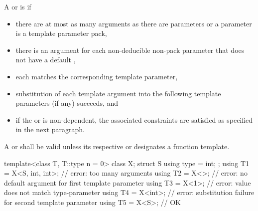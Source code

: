 \pnum
A  or 
is  if
\begin{itemize}
\item
  there are at most as many arguments as there are parameters
  or a parameter is a template parameter pack,

\item
  there is an argument for each non-deducible non-pack parameter
  that does not have a default ,

\item
  each  matches the corresponding
  template parameter,

\item
  substitution of each template argument into the following
  template parameters (if any) succeeds, and

\item
  if the  or
   is non-dependent,
  the associated constraints are satisfied as specified in the next paragraph.
\end{itemize}
A  or
shall be valid unless its respective
 or 
designates a function template.
\begin{example}
\begin{codeblock}
template<class T, T::type n = 0> class X;
struct S {
  using type = int;
};
using T1 = X<S, int, int>;      // error: too many arguments
using T2 = X<>;                 // error: no default argument for first template parameter
using T3 = X<1>;                // error: value  does not match type-parameter
using T4 = X<int>;              // error: substitution failure for second template parameter
using T5 = X<S>;                // OK
\end{codeblock}
\end{example}

